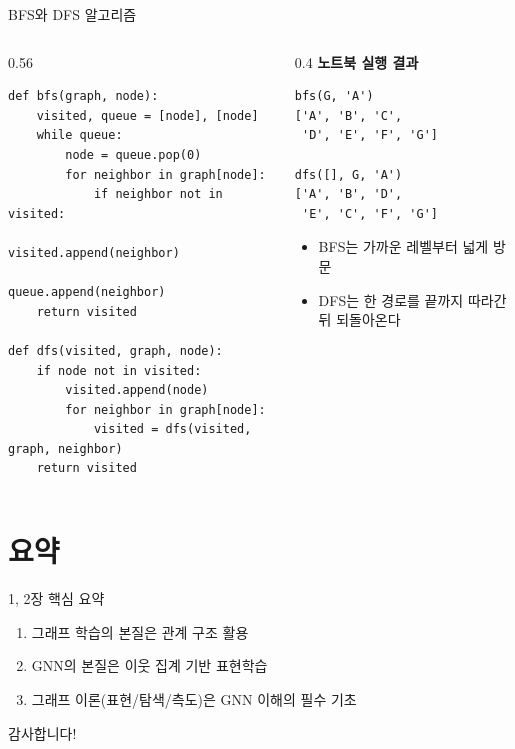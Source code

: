 \begin{frame}[fragile]{BFS와 DFS 알고리즘}
\begin{columns}[T,onlytextwidth]
\begin{column}{0.56\textwidth}
\begin{lstlisting}
def bfs(graph, node):
    visited, queue = [node], [node]
    while queue:
        node = queue.pop(0)
        for neighbor in graph[node]:
            if neighbor not in visited:
                visited.append(neighbor)
                queue.append(neighbor)
    return visited

def dfs(visited, graph, node):
    if node not in visited:
        visited.append(node)
        for neighbor in graph[node]:
            visited = dfs(visited, graph, neighbor)
    return visited
\end{lstlisting}
\end{column}
\begin{column}{0.4\textwidth}
\small
\textbf{노트북 실행 결과}
\begin{verbatim}
bfs(G, 'A')
['A', 'B', 'C',
 'D', 'E', 'F', 'G']

dfs([], G, 'A')
['A', 'B', 'D',
 'E', 'C', 'F', 'G']
\end{verbatim}
\vspace{0.3em}
\begin{itemize}
  \item BFS는 가까운 레벨부터 넓게 방문
  \item DFS는 한 경로를 끝까지 따라간 뒤 되돌아온다
\end{itemize}
\end{column}
\end{columns}
\end{frame}


\section{요약}
\begin{frame}{1, 2장 핵심 요약}
\begin{enumerate}
  \item 그래프 학습의 본질은 관계 구조 활용
  \item GNN의 본질은 이웃 집계 기반 표현학습
  \item 그래프 이론(표현/탐색/측도)은 GNN 이해의 필수 기초
\end{enumerate}
\end{frame}

\begin{frame}
\huge\centering
감사합니다!
\end{frame}
